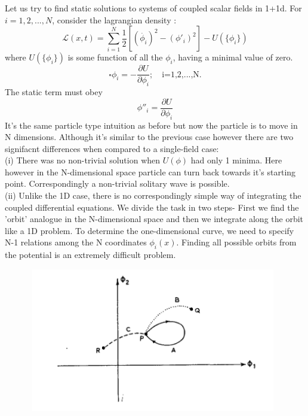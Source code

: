 \documentclass[a4paper, 12pt]{article}
\begin{document}
Let us try to find static solutions to systems of coupled scalar fields in 1+1d. For $i=1,2,...,N$, consider the lagrangian density :
\begin{equation}%
\mathcal{L}(x,t) = \sum_{i=1}^{N}\frac{1}{2}[(\dot{\phi_i})^2 - (\phi'_i)^2 ] -U(\{\phi_i\})
\end{equation}
where $U(\{\phi_i\})$ is some function of all the $\phi_i$, having a minimal value of zero.
\begin{equation}%
 \square \phi_i  = -\frac{\partial U}{\partial \phi_i}; \quad \textrm{i=1,2,...,N.}
 \end{equation}
The static term must obey
\begin{equation}%
 \phi''_i = \frac{\partial U}{\partial \phi_i}
 \end{equation}
It's the same particle type intuition as before but now the particle is to move in N dimensions. Although it's similar to the previous case however there are two signifacnt differences when compared to a single-field case:\\
(i) There was no non-trivial solution when $U(\phi)$ had only 1 minima. Here however in the N-dimensional space particle can turn back towards it's starting point. Correspondingly a non-trivial solitary wave is possible.\\
(ii) Unlike the 1D case, there is no correspondingly simple way of integrating the coupled differential equations. We divide the task in two steps- First we find the 'orbit' analogue in the N-dimensional space and then we integrate along the orbit like a 1D problem. To determine the one-dimensional curve, we need to specify N-1 relations among the N coordinates $\phi_i(x)$. Finding all possible orbits from the potential is an extremely difficult problem.


  \begin{figure}[ht]
    \centering
    \includegraphics[height=6.27cm, width=11cm]{fig3}
\end{figure}
 
\end{document}
